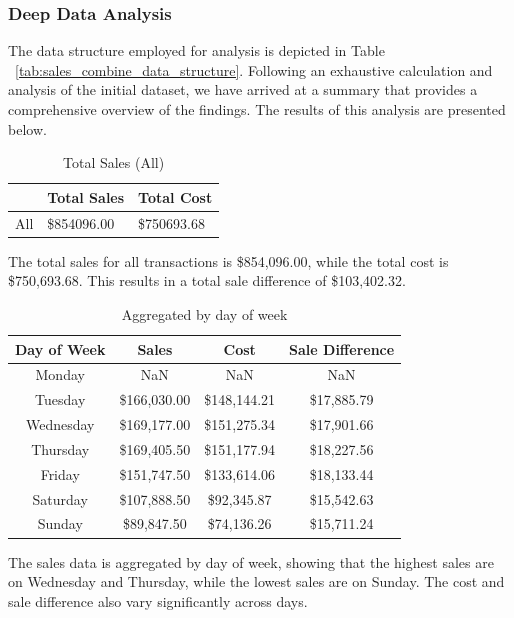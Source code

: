 \subsubsection{Deep Data Analysis}

The data structure employed for analysis is depicted in Table ~\ref{tab:sales_combine_data_structure}. Following an exhaustive calculation and analysis of the initial dataset, we have arrived at a summary that provides a comprehensive overview of the findings. The results of this analysis are presented below.

\begin{table}[H]
	\centering
	\begin{tabular}{lll}
		\toprule
		& Total Sales & Total Cost \\
		\midrule
		All & \$854096.00 & \$750693.68 \\
		\bottomrule
	\end{tabular}
	\caption{Total Sales (All)}
	\label{tab:total_sales_all}
\end{table}

The total sales for all transactions is \$854,096.00, while the total cost is \$750,693.68. This results in a total sale difference of \$103,402.32.

\begin{table}[H]
	\centering
	\begin{tabular}{cccc}
		\toprule
		Day of Week & Sales & Cost & Sale Difference \\
		\midrule
		Monday & NaN & NaN & NaN \\
		Tuesday & \$166,030.00 & \$148,144.21 & \$17,885.79 \\
		Wednesday & \$169,177.00 & \$151,275.34 & \$17,901.66 \\
		Thursday & \$169,405.50 & \$151,177.94 & \$18,227.56 \\
		Friday & \$151,747.50 & \$133,614.06 & \$18,133.44 \\
		Saturday & \$107,888.50 & \$92,345.87 & \$15,542.63 \\
		Sunday & \$89,847.50 & \$74,136.26 & \$15,711.24 \\
		\bottomrule
	\end{tabular}
	\caption{Aggregated by day of week}
	\label{tab:aggregated_by_day_of_week}
\end{table}

The sales data is aggregated by day of week, showing that the highest sales are on Wednesday and Thursday, while the lowest sales are on Sunday. The cost and sale difference also vary significantly across days.

